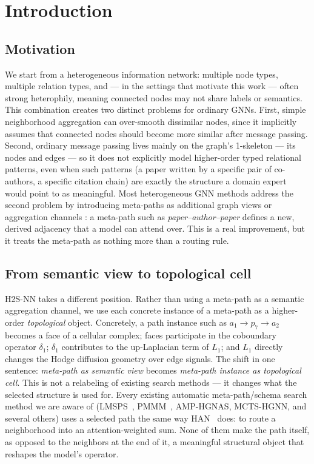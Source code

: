 \documentclass{article}
\begin{document}
\section{Introduction}
\label{sec:intro}

\subsection{Motivation}

We start from a heterogeneous information network: multiple node types, multiple relation types,
and --- in the settings that motivate this work --- often strong heterophily, meaning connected
nodes may not share labels or semantics. This combination creates two distinct problems for
ordinary GNNs. First, simple neighborhood aggregation can over-smooth dissimilar nodes, since it
implicitly assumes that connected nodes should become more similar after message passing. Second,
ordinary message passing lives mainly on the graph's 1-skeleton --- its nodes and edges --- so it
does not explicitly model higher-order typed relational patterns, even when such patterns (a paper
written by a specific pair of co-authors, a specific citation chain) are exactly the structure a
domain expert would point to as meaningful. Most heterogeneous GNN methods address the second
problem by introducing meta-paths as additional graph views or aggregation channels
\citep{wang2019han,fu2020magnn}: a meta-path such as \emph{paper--author--paper} defines a new,
derived adjacency that a model can attend over. This is a real improvement, but it treats the
meta-path as nothing more than a routing rule.

\subsection{From semantic view to topological cell}

H2S-NN takes a different position. Rather than using a meta-path as a semantic aggregation
channel, we use each concrete instance of a meta-path as a higher-order \emph{topological} object.
Concretely, a path instance such as $a_1 \to p_7 \to a_2$ becomes a face of a cellular complex;
faces participate in the coboundary operator $\delta_1$; $\delta_1$ contributes to the up-Laplacian
term of $L_1$; and $L_1$ directly changes the Hodge diffusion geometry over edge signals. The shift
in one sentence: \emph{meta-path as semantic view} becomes \emph{meta-path instance as topological
cell}. This is not a relabeling of existing search methods --- it changes what the selected
structure is used for. Every existing automatic meta-path/schema search method we are aware of
(LMSPS~\citep{yan2024lmsps}, PMMM~\citep{jiang2022pmmm}, AMP-HGNAS, MCTS-HGNN, and several others)
uses a selected path the same way HAN~\citep{wang2019han} does: to route a neighborhood into an
attention-weighted sum. None of them make the path itself, as opposed to the neighbors at the end
of it, a meaningful structural object that reshapes the model's operator.
\end{document}
